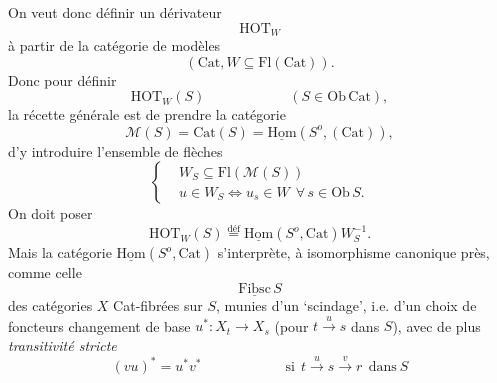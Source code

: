 \documentclass[11pt]{article}
\newcommand{\msp}[1]{\marginpar{\footnotesize [#1]}}
\newcommand{\deq}{\overset{\text{déf}}{=}}
\begin{document}
\noindent On veut donc définir un dérivateur
\[
\mathrm{HOT}_W
\]
à partir de la catégorie de modèles
\[
(\mathrm{Cat}, W \subseteq \mathrm{Fl}(\mathrm{Cat})).
\]
Donc pour définir
\[
\mathrm{HOT}_W(S) \qquad\qquad\qquad (S \in \mathrm{Ob}\,\mathrm{Cat}),
\]
la récette générale est de prendre la catégorie %
\[
\mathcal{M}(S) = \mathrm{Cat}(S) = \underline{\mathrm{Hom}}(S^o, (\mathrm{Cat})),
\]
d'y introduire l'ensemble de flèches
\[
\left\{
\begin{aligned}
& W_S \subseteq \mathrm{Fl}(\mathcal{M}(S)) \\
& u \in W_S \Longleftrightarrow u_s \in W \ \ \forall\, s \in \mathrm{Ob}\,S.
\end{aligned}
\right.
\]
On doit poser
\[
\mathrm{HOT}_W(S) \deq \underline{\mathrm{Hom}}(S^o, \mathrm{Cat})W_S^{-1}.
\]
Mais la catégorie $\underline{\mathrm{Hom}}(S^o, \mathrm{Cat})$ s'interprète, à isomorphisme canonique près, comme celle
\[
\underline{\mathrm{Fibsc}}\,S
\]
des catégories $X$ Cat-fibrées sur $S$, munies d'un `scindage', i.e. d'un choix de foncteurs changement de base $u^* : X_t \longrightarrow X_s$ (pour $t \xrightarrow{u} s$ dans $S$), avec de plus \textit{transitivité stricte}
\[
(vu)^* = u^* v^* \qquad\qquad\qquad \text{si}\ \ t \xrightarrow{u} s \xrightarrow{v} r\ \ \text{dans}\ S
\]

\noindent\msp{page 4}
\end{document}
